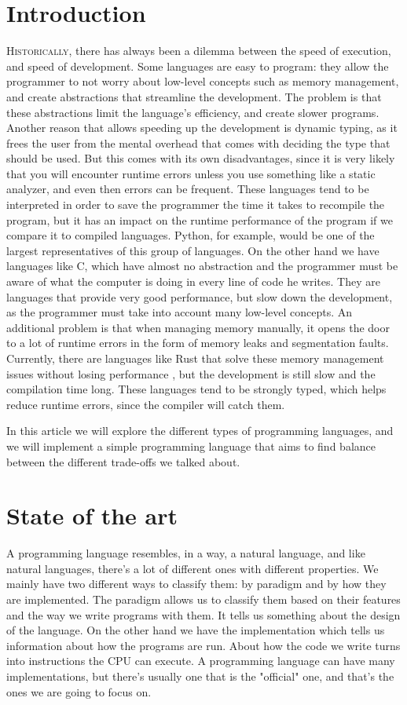 ﻿\documentclass[10pt,a4paper,twocolumn,twoside]{article}
\begin{document}
\section{Introduction} \lettrine[lines=3]{H}{istorically}, there has always been
a dilemma between the speed of execution, and speed of development. Some
languages are easy to program: they allow the programmer to not worry about
low-level concepts such as memory management, and create abstractions that
streamline the development. The problem is that these abstractions limit the
language's efficiency, and create slower programs. Another reason that allows
speeding up the development is dynamic typing, as it frees the user from the
mental overhead that comes with deciding the type that should be used. But this
comes with its own disadvantages, since it is very likely that you will
encounter runtime errors unless you use something like a static analyzer, and
even then errors can be frequent. These languages tend to be interpreted in
order to save the programmer the time it takes to recompile the program, but it
has an impact on the runtime performance of the program if we compare it to
compiled languages. Python, for example, would be one of the largest
representatives of this group of languages. On the other hand we have languages
like C, which have almost no abstraction and the programmer must be aware of
what the computer is doing in every line of code he writes. They are languages
that provide very good performance, but slow down the development, as the
programmer must take into account many low-level concepts. An additional problem
is that when managing memory manually, it opens the door to a lot of runtime
errors in the form of memory leaks and segmentation faults. Currently, there are
languages like Rust that solve these memory management issues without losing
performance \cite{rustsafety}, but the development is still slow and the
compilation time long. These languages tend to be strongly typed, which helps
reduce runtime errors, since the compiler will catch them.

In this article we will explore the different types of programming languages,
and we will implement a simple programming language that aims to find balance
between the different trade-offs we talked about.

\section{State of the art}
A programming language resembles, in a way, a natural language, and like natural
languages, there's a lot of different ones with different properties. We mainly
have two different ways to classify them: by paradigm and by how they are
implemented. The paradigm allows us to classify them based on their features and
the way we write programs with them. It tells us something about the design of
the language. On the other hand we have the implementation which tells us
information about how the programs are run. About how the code we write turns
into instructions the CPU can execute. A programming language can have many
implementations, but there's usually one that is the "official" one, and that's
the ones we are going to focus on.
\end{document}
